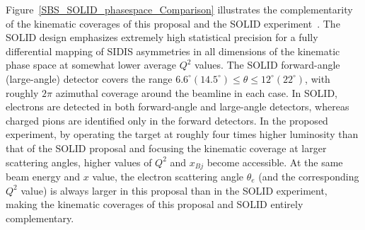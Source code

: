 Figure~\ref{SBS_SOLID_phasespace_Comparison} illustrates the complementarity of the kinematic coverages of this proposal and the SOLID experiment~\cite{SOLID_He3_longitudinal}. The SOLID design emphasizes extremely high statistical precision for a fully differential mapping of SIDIS asymmetries in all dimensions of the kinematic phase space at somewhat lower average $Q^2$ values. The SOLID forward-angle (large-angle) detector covers the range $6.6^\circ (14.5^\circ) \le \theta \le 12^\circ (22^\circ)$, with roughly $2\pi$ azimuthal coverage around the beamline in each case. In SOLID, electrons are detected in both forward-angle and large-angle detectors, whereas charged pions are identified only in the forward detectors. In the proposed experiment, by operating the target at roughly four times higher luminosity than that of the SOLID proposal and focusing the kinematic coverage at larger scattering angles, higher values of $Q^2$ and $x_{Bj}$ become accessible. At the same beam energy and $x$ value, the electron scattering angle $\theta_e$ (and the corresponding $Q^2$ value) is always larger in this proposal than in the SOLID experiment, making the kinematic coverages of this proposal and SOLID entirely complementary. 

